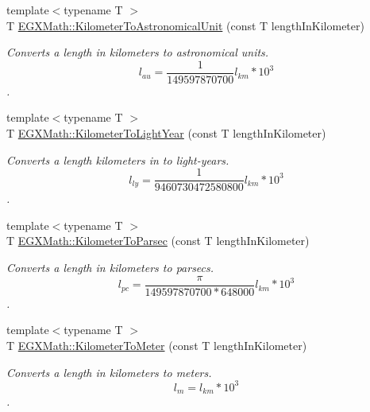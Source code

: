 \begin{DoxyCompactItemize}
\item 
{\footnotesize template$<$typename T $>$ }\\T \mbox{\hyperlink{group___e_g_x_math-_conversions-_length_conversions-_s_i-_kilometer-_astronomical_ga4c5c2b67611651c04072bfbb394a4ca7}{E\+G\+X\+Math\+::\+Kilometer\+To\+Astronomical\+Unit}} (const T length\+In\+Kilometer)
\begin{DoxyCompactList}\small\item\em Converts a length in kilometers to astronomical units. \[ l_{au}= \frac{1}{149597870700} l_{km} * 10^{3} \]. \end{DoxyCompactList}\item 
{\footnotesize template$<$typename T $>$ }\\T \mbox{\hyperlink{group___e_g_x_math-_conversions-_length_conversions-_s_i-_kilometer-_astronomical_ga265181afd822c061f51a157da711c0c5}{E\+G\+X\+Math\+::\+Kilometer\+To\+Light\+Year}} (const T length\+In\+Kilometer)
\begin{DoxyCompactList}\small\item\em Converts a length kilometers in to light-\/years. \[ l_{ly}= \frac{1}{9460730472580800} l_{km} * 10^{3} \]. \end{DoxyCompactList}\item 
{\footnotesize template$<$typename T $>$ }\\T \mbox{\hyperlink{group___e_g_x_math-_conversions-_length_conversions-_s_i-_kilometer-_astronomical_ga0d120dfc56490ce318348950abb25dd1}{E\+G\+X\+Math\+::\+Kilometer\+To\+Parsec}} (const T length\+In\+Kilometer)
\begin{DoxyCompactList}\small\item\em Converts a length in kilometers to parsecs. \[ l_{pc}=\frac{\pi}{149597870700 * 648000} l_{km} * 10^{3} \]. \end{DoxyCompactList}\item 
{\footnotesize template$<$typename T $>$ }\\T \mbox{\hyperlink{group___e_g_x_math-_conversions-_length_conversions-_s_i-_kilometer-_s_i_ga0c3c04124b670e73baa39fb7c9ed5846}{E\+G\+X\+Math\+::\+Kilometer\+To\+Meter}} (const T length\+In\+Kilometer)
\begin{DoxyCompactList}\small\item\em Converts a length in kilometers to meters. \[ l_{m}=l_{km} * 10^{3} \]. \end{DoxyCompactList}\item 

\end{DoxyCompactItemize}
